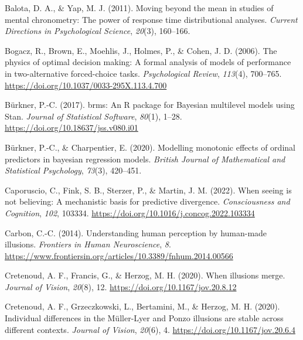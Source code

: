 \documentclass[
  man,floatsintext]{apa6}
\newlength{\cslhangindent}
\newlength{\cslentryspacingunit} %
\newenvironment{CSLReferences}[2] %
 {%
  \setlength{\parindent}{0pt}
  \ifodd #1
  \let\oldpar\par
  \def\par{\hangindent=\cslhangindent\oldpar}
  \fi
  \setlength{\parskip}{#2\cslentryspacingunit}
 }%
 {}
\begin{document}
\hypertarget{refs}{}
\begin{CSLReferences}{1}{0}
\leavevmode{}%
Balota, D. A., \& Yap, M. J. (2011). Moving beyond the mean in studies of mental chronometry: The power of response time distributional analyses. \emph{Current Directions in Psychological Science}, \emph{20}(3), 160--166.

\leavevmode{}%
Bogacz, R., Brown, E., Moehlis, J., Holmes, P., \& Cohen, J. D. (2006). The physics of optimal decision making: A formal analysis of models of performance in two-alternative forced-choice tasks. \emph{Psychological Review}, \emph{113}(4), 700--765. \url{https://doi.org/10.1037/0033-295X.113.4.700}

\leavevmode{}%
Bürkner, P.-C. (2017). {brms}: An {R} package for {Bayesian} multilevel models using {Stan}. \emph{Journal of Statistical Software}, \emph{80}(1), 1--28. \url{https://doi.org/10.18637/jss.v080.i01}

\leavevmode{}%
Bürkner, P.-C., \& Charpentier, E. (2020). Modelling monotonic effects of ordinal predictors in bayesian regression models. \emph{British Journal of Mathematical and Statistical Psychology}, \emph{73}(3), 420--451.

\leavevmode{}%
Caporuscio, C., Fink, S. B., Sterzer, P., \& Martin, J. M. (2022). When seeing is not believing: A mechanistic basis for predictive divergence. \emph{Consciousness and Cognition}, \emph{102}, 103334. \url{https://doi.org/10.1016/j.concog.2022.103334}

\leavevmode{}%
Carbon, C.-C. (2014). Understanding human perception by human-made illusions. \emph{Frontiers in Human Neuroscience}, \emph{8}. \url{https://www.frontiersin.org/articles/10.3389/fnhum.2014.00566}

\leavevmode{}%
Cretenoud, A. F., Francis, G., \& Herzog, M. H. (2020). When illusions merge. \emph{Journal of Vision}, \emph{20}(8), 12. \url{https://doi.org/10.1167/jov.20.8.12}

\leavevmode{}%
Cretenoud, A. F., Grzeczkowski, L., Bertamini, M., \& Herzog, M. H. (2020). Individual differences in the Müller-Lyer and Ponzo illusions are stable across different contexts. \emph{Journal of Vision}, \emph{20}(6), 4. \url{https://doi.org/10.1167/jov.20.6.4}


\end{CSLReferences}
\end{document}
